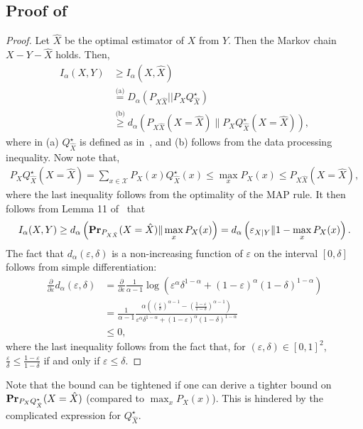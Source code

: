 \documentclass{article}
\numberwithin{theorem}{section}
\numberwithin{example}{section}
\numberwithin{remark}{section}
\numberwithin{definition}{section}
\def\Pr{{\rm \mathbf {Pr}}}
\newcommand{\X}{\mathcal{X}}
\newcommand{\eps}{\varepsilon}
\newcommand{\ds}{\displaystyle}
\begin{document}
\subsection{Proof of~} \label{app:fano-1}
\begin{proof}
    Let $\hat{X}$ be the optimal estimator of $X$ from $Y$. Then the Markov chain $X-Y-\hat{X}$ holds. Then,
    \begin{align}
        I_\alpha(X,Y) & \geq I_\alpha \left(X, \hat{X} \right) \\
        & \stackrel{\text{(a)}} = D_\alpha \left(P_{X \hat{X}} || P_X Q^\star_{\hat{X}} \right) \\
        & \stackrel{\text{(b)}} \geq d_\alpha \left( {P_{X \hat{X}}}( X =\hat{X}) \| 
        {P_X Q^\star_{\hat{X}}} ( X =\hat{X}) \right), 
    \end{align}
    where in (a) $Q^\star_{\hat{X}}$ is defined as in~, and (b) follows from the data processing inequality. Now note that,
    \begin{align} \label{eq:bound-guess-prob}
        {P_X Q^\star_{\hat{X}}} ( X =\hat{X})  = \sum_{x \in \X} P_X(x) Q^\star_{\hat{X}}(x) \leq \max_x P_X(x) \leq {P_{X \hat{X}}}( X =\hat{X}),
    \end{align}
    where the last inequality follows from the optimality of the MAP rule. It then follows from Lemma 11 of~\cite{Rioul:21} that
    \begin{align}
        I_\alpha(X,Y) \geq d_\alpha \left( \Pr_{P_{X \hat{X}}}( X =\hat{X}) \| \max_x P_X(x) \right) = d_\alpha \left (\eps_{X|Y} \| 1- \max_x P_X(x) \right).
    \end{align}
    The fact that $d_\alpha(\eps,\delta)$ is a non-increasing function of $\eps$ on the interval $[0,\delta]$ follows from simple differentiation:
    \begin{align}
        \frac{\partial }{\partial \eps} d_\alpha(\eps, \delta) & = \frac{\partial }{\partial \eps} \frac{1}{\alpha-1} \log \left( \eps^\alpha \delta^{1-\alpha} + (1-\eps)^\alpha (1-\delta)^{1-\alpha} \right) \\
        & = \frac{1}{\alpha -1} \frac{ \alpha  \left(   \left( \frac{\eps}{\delta} \right)^{\alpha-1} - \left( \frac{1-\eps}{1-\delta} \right)^{\alpha-1}  \right)  }{ \eps^\alpha \delta^{1-\alpha} + (1-\eps)^\alpha (1-\delta)^{1-\alpha}} \\
        & \leq 0,
    \end{align}
    where the last inequality follows from the fact that, for $(\eps,\delta) \in [0,1]^2$, $\ds \frac{\eps}{\delta} \leq \frac{1-\eps}{1-\delta}$ if and only if $\eps \leq \delta$.
\end{proof} Note that the bound can be tightened if one can derive a tighter bound on $ \Pr_{P_X Q^\star_{\hat{X}}} ( X =\hat{X})$ (compared to $\max_x P_X(x)$). This is hindered by the complicated expression for $Q^\star_{\hat{X}}$.
\end{document}
